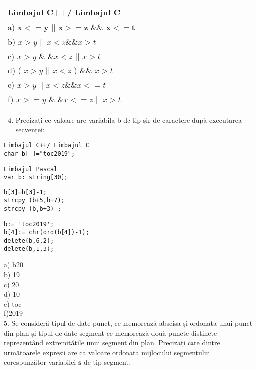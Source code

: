 \begin{center}
\begin{tabular}{|l|}
\hline
Limbajul C++/ Limbajul C \\
\hline
a) $\mathbf{x}<=\mathbf{y}$ || $\mathbf{x}>=\mathbf{z}$ \&\& $\mathbf{x}<=\mathbf{t}$ \\
\hline
b) $x>y$ || $x<z \& \& x>t$ \\
\hline
c) $x>y$ \& $\& x<z$ || $x>t$ \\
\hline
d) ( $x>y$ || $x<z$ ) \&\& $x>t$ \\
\hline
e) $x>y$ || $x<z \& \& x<=t$ \\
\hline
f) $x>=y$ \& $\& x<=z$ || $x>t$ \\
\hline
\end{tabular}
\end{center}

\begin{enumerate}
  \setcounter{enumi}{3}
  \item Precizați ce valoare are variabila b de tip șir de caractere după executarea secvenței:
\end{enumerate}

\begin{verbatim}
Limbajul C++/ Limbajul C
char b[ ]="toc2019";
\end{verbatim}

\begin{verbatim}
Limbajul Pascal
var b: string[30];
\end{verbatim}

\begin{verbatim}
b[3]=b[3]-1;
strcpy (b+5,b+7);
strcpy (b,b+3) ;
\end{verbatim}

\begin{verbatim}
b:= 'toc2019';
b[4]:= chr(ord(b[4])-1);
delete(b,6,2);
delete(b,1,3);
\end{verbatim}

a) b20\\
b) 19\\
c) 20\\
d) 10\\
e) toc\\
f)2019\\
5. Se consideră tipul de date punct, ce memorează abscisa și ordonata unui punct din plan și tipul de date segment ce memorează două puncte distincte reprezentând extremitățile unui segment din plan. Precizați care dintre următoarele expresii are ca valoare ordonata mijlocului segmentului corespunzător variabilei $\mathbf{s}$ de tip segment.

